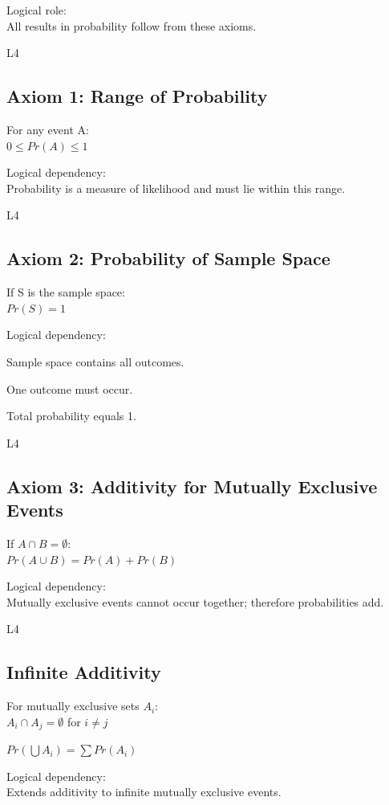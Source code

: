 \documentclass[12pt]{article}
\begin{document}
Logical role: \\
All results in probability follow from these axioms. 

L4

\subsection*{Axiom 1: Range of Probability}

For any event A: \\
$0 \leq Pr(A) \leq 1$

Logical dependency: \\
Probability is a measure of likelihood and must lie within this range. 

L4

\subsection*{Axiom 2: Probability of Sample Space}

If S is the sample space: \\
$Pr(S) = 1$

Logical dependency:

Sample space contains all outcomes.

One outcome must occur.

Total probability equals 1. 

L4

\subsection*{Axiom 3: Additivity for Mutually Exclusive Events}

If $A \cap B = \emptyset$: \\
$Pr(A \cup B) = Pr(A) + Pr(B)$

Logical dependency: \\
Mutually exclusive events cannot occur together; therefore probabilities add. 

L4

\subsection*{Infinite Additivity}

For mutually exclusive sets $A_i$: \\
$A_i \cap A_j = \emptyset$ for $i \neq j$

$Pr\left(\bigcup A_i\right) = \sum Pr(A_i)$

Logical dependency: \\
Extends additivity to infinite mutually exclusive events. 
\end{document}
